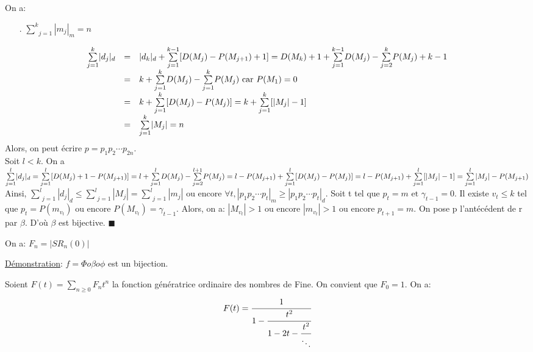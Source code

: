 			On a:
			\begin{itemize}
				\item[.] $ \underset{j=1}{\overset{k}{\sum}}|m_{j}|_{m} = n$
			\end{itemize}
			$$
			\begin{array}{c c l}
				\underset{j=1}{\overset{k}{\sum}}|d_{j}|_{d} &=& |d_{k}|_{d}+ \underset{j=1}{\overset{k-1}{\sum}}[D(M_{j})-P(M_{j+1})+1]= D(M_{k})+1 + \underset{j=1}{\overset{k-1}{\sum}}D(M_{j}) - \underset{j=2}{\overset{k}{\sum}}P(M_{j}) + k-1\\
				&=& k+ \underset{j=1}{\overset{k}{\sum}}D(M_{j})- \underset{j=1}{\overset{k}{\sum}}P(M_{j}) \text{ car }P(M_{1})=0\\
				&=&k+ \underset{j=1}{\overset{k}{\sum}}[D(M_{j})- P(M_{j})] = k+ \underset{j=1}{\overset{k}{\sum}}[|M_{j}|-1]\\
				&=&\underset{j=1}{\overset{k}{\sum}}|M_{j}|=n
			\end{array}
			$$
			Alors, on peut écrire $ p=p_{1}p_{2} \cdots p_{2n}$.\\ Soit $l < k$. 
			On a $\underset{j=1}{\overset{l}{\sum}}|d_{j}|_{d} = \underset{j=1}{\overset{l}{\sum}}[D(M_{j})+1-P(M_{j+1})] = l+ \underset{j=1}{\overset{l}{\sum}}D(M_{j}) - \underset{j=2}{\overset{l+1}{\sum}}P(M_{j}) \\= l- P(M_{j+1}) + \underset{j=1}{\overset{l}{\sum}}[D(M_{j})-P(M_{j})] = l- P(M_{j+1})+ \underset{j=1}{\overset{l}{\sum}}[|M_{j}|-1] = \underset{j=1}{\overset{l}{\sum}}|M_{j}| - P(M_{j+1})$\\
			Ainsi, $\underset{j=1}{\overset{l}{\sum}}|d_{j}|_{d} \leq \underset{j=1}{\overset{l}{\sum}}|M_{j}|= \underset{j=1}{\overset{l}{\sum}}|m_{j}|$ ou encore $\forall t, |p_{1}p_{2} \cdots p_{t}|_{m} \geq |p_{1}p_{2} \cdots p_{t}|_{d}$. Soit t tel que $p_{t}=m \text{ et } \gamma_{t-1}=0$. Il existe $v_{t} \leq k$ tel que $p_{t}=P(m_{v_{t}}) $ ou encore $P(M_{v_{t}})=\gamma_{t-1}$. Alors, on a: $|M_{v_{t}}|>1$ ou encore  $|m_{v_{t}}|>1$ ou encore $p_{t+1}=m$. On pose p l'antécédent de r par $\beta$. D'où $\beta$ est bijective. $\blacksquare$
		\begin{corollaire}
			\begin{rm}
				On a: $F_{n}=|SR_{n}(0)|$
			\end{rm}
		\end{corollaire}
		\underline{Démonstration}: $f = \Phi o \beta o \phi $ est un bijection.
		\begin{proposition}
			Soient $F(t) = \underset{n \geq 0}{\sum}F_{n}t^n$ la fonction génératrice ordinaire des nombres de Fine. On convient que $F_{0}=1$. On a:
			\[
				F(t) = \cfrac{1}{1 - \cfrac{t^2}{1 - 2t - \cfrac{t^2}{\ddots}}}
			\]
		\end{proposition}
